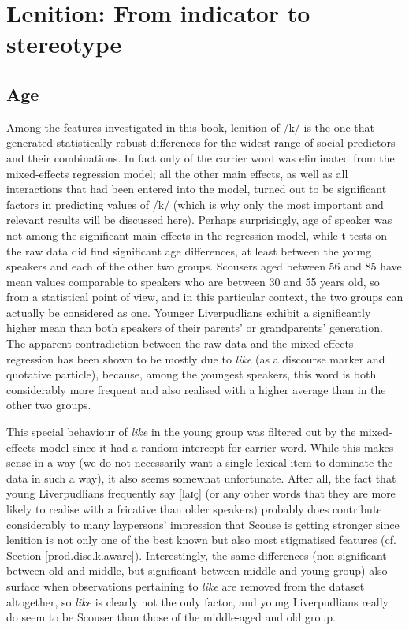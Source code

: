 \section{Lenition: From indicator to stereotype}
\label{prod.disc.k}

\subsection{Age}
\label{prod.disc.k.age}

Among the features investigated in this book, lenition of /k/ is the one that generated statistically robust differences for the widest range of social predictors and their combinations.
In fact only  of the carrier word was eliminated from the mixed-effects regression model; all the other main effects, as well as all interactions that had been entered into the model, turned out to be significant factors in predicting  values of /k/ (which is why only the most important and relevant results will be discussed here).
Perhaps surprisingly, age of speaker was not among the significant main effects in the regression model, while t-tests on the raw data did find significant age differences, at least between the young speakers and each of the other two groups.
Scousers aged between 56 and 85 have mean  values comparable to speakers who are between 30 and 55 years old, so from a statistical point of view, and in this particular context, the two groups can actually be considered as one.
Younger Liverpudlians exhibit a significantly higher mean  than both speakers of their parents' or grandparents' generation.
The apparent contradiction between the raw data and the mixed-effects regression has been shown to be mostly due to \emph{like} (as a discourse marker and quotative particle), because, among the youngest speakers, this word is both considerably more frequent and also realised with a higher average  than in the other two groups. 

This special behaviour of \emph{like} in the young group was filtered out by the mixed-effects model since it had a random intercept for carrier word.
While this makes sense in a way (we do not necessarily want a single lexical item to dominate the data in such a way), it also seems somewhat unfortunate.
After all, the fact that young Liverpudlians frequently say [laɪç] (or any other words that they are more likely to realise with a fricative than older speakers) probably does contribute considerably to many laypersons' impression that Scouse is getting stronger since lenition is not only one of the best known but also most stigmatised features (cf. Section \ref{prod.disc.k.aware}).
Interestingly, the same differences (non-significant between old and middle, but significant between middle and young group) also surface when observations pertaining to \emph{like} are removed from the dataset altogether, so \emph{like} is clearly not the only factor, and young Liverpudlians really do seem to be Scouser than those of the middle-aged and old group.

